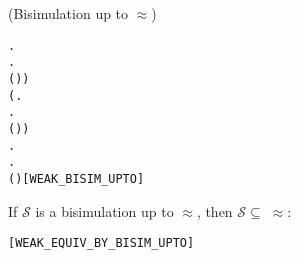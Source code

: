 \begin{definition}{(Bisimulation up to $\approx$)}
\begin{alltt}
           \HOLSymConst{\HOLTokenForall{}}.
                \HOLTokenTransBegin{} \HOLTokenTransEnd {} \HOLSymConst{\HOLTokenImp{}}
               \HOLSymConst{\HOLTokenExists{}}.
                    \HOLTokenWeakTransBegin{} \HOLTokenImp{}  \HOLSymConst{\HOLTokenConj{}}
                   ( \HOLSymConst{\HOLTokenRCompose{}}  \HOLSymConst{\HOLTokenRCompose{}} )  ) \HOLSymConst{\HOLTokenConj{}}
      (\HOLSymConst{\HOLTokenForall{}}.
            \HOLTokenTransBegin\HOLSymConst{\ensuremath{\tau}}\HOLTokenTransEnd {} \HOLSymConst{\HOLTokenImp{}}
           \HOLSymConst{\HOLTokenExists{}}.
                \HOLSymConst{\HOLTokenEPS}  \HOLSymConst{\HOLTokenConj{}}
               ( \HOLSymConst{\HOLTokenRCompose{}}  \HOLSymConst{\HOLTokenRCompose{}} )  ) \HOLSymConst{\HOLTokenConj{}}
      \HOLSymConst{\HOLTokenForall{}}.
           \HOLTokenTransBegin\HOLSymConst{\ensuremath{\tau}}\HOLTokenTransEnd {} \HOLSymConst{\HOLTokenImp{}}
          \HOLSymConst{\HOLTokenExists{}}.
               \HOLSymConst{\HOLTokenEPS}  \HOLSymConst{\HOLTokenConj{}} ( \HOLSymConst{\HOLTokenRCompose{}}  \HOLSymConst{\HOLTokenRCompose{}} )  \hfill{[WEAK_BISIM_UPTO]}
\end{alltt}
\end{definition}

\begin{theorem}
If $\mathcal{S}$ is a bisimulation up to $\approx$, then
$\mathcal{S} \subseteq\;\approx$:
\begin{alltt}
\HOLTokenTurnstile{}   \HOLSymConst{\HOLTokenConj{}}    \HOLSymConst{\HOLTokenImp{}}  \HOLSymConst{\HOLTokenWeakEQ} \hfill{[WEAK_EQUIV_BY_BISIM_UPTO]}
\end{alltt}
\end{theorem}

